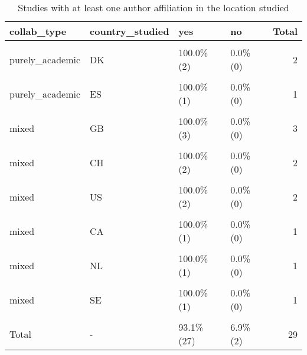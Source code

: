 \documentclass[
]{article}
\begin{document}
\begin{table}[H]

\caption{\label{tab:unnamed-chunk-46}Studies with at least one author affiliation in the location studied}
\centering
\begin{tabular}[t]{llllr}
\toprule
collab\_type & country\_studied & yes & no & Total\\
\midrule
\cellcolor{gray!6}{purely\_academic} & \cellcolor{gray!6}{NL} & \cellcolor{gray!6}{100.0\%  (4)} & \cellcolor{gray!6}{0.0\% (0)} & \cellcolor{gray!6}{4}\\
purely\_academic & DK & 100.0\%  (2) & 0.0\% (0) & 2\\
\cellcolor{gray!6}{purely\_academic} & \cellcolor{gray!6}{GB} & \cellcolor{gray!6}{66.7\%  (2)} & \cellcolor{gray!6}{33.3\% (1)} & \cellcolor{gray!6}{3}\\
purely\_academic & ES & 100.0\%  (1) & 0.0\% (0) & 1\\
\cellcolor{gray!6}{purely\_academic} & \cellcolor{gray!6}{US} & \cellcolor{gray!6}{100.0\%  (1)} & \cellcolor{gray!6}{0.0\% (0)} & \cellcolor{gray!6}{1}\\
\addlinespace
mixed & GB & 100.0\%  (3) & 0.0\% (0) & 3\\
\cellcolor{gray!6}{mixed} & \cellcolor{gray!6}{AU} & \cellcolor{gray!6}{100.0\%  (2)} & \cellcolor{gray!6}{0.0\% (0)} & \cellcolor{gray!6}{2}\\
mixed & CH & 100.0\%  (2) & 0.0\% (0) & 2\\
\cellcolor{gray!6}{mixed} & \cellcolor{gray!6}{FR} & \cellcolor{gray!6}{100.0\%  (2)} & \cellcolor{gray!6}{0.0\% (0)} & \cellcolor{gray!6}{2}\\
mixed & US & 100.0\%  (2) & 0.0\% (0) & 2\\
\addlinespace
\cellcolor{gray!6}{mixed} & \cellcolor{gray!6}{AT} & \cellcolor{gray!6}{100.0\%  (1)} & \cellcolor{gray!6}{0.0\% (0)} & \cellcolor{gray!6}{1}\\
mixed & CA & 100.0\%  (1) & 0.0\% (0) & 1\\
\cellcolor{gray!6}{mixed} & \cellcolor{gray!6}{JP} & \cellcolor{gray!6}{100.0\%  (1)} & \cellcolor{gray!6}{0.0\% (0)} & \cellcolor{gray!6}{1}\\
mixed & NL & 100.0\%  (1) & 0.0\% (0) & 1\\
\cellcolor{gray!6}{mixed} & \cellcolor{gray!6}{NZ} & \cellcolor{gray!6}{100.0\%  (1)} & \cellcolor{gray!6}{0.0\% (0)} & \cellcolor{gray!6}{1}\\
\addlinespace
mixed & SE & 100.0\%  (1) & 0.0\% (0) & 1\\
\cellcolor{gray!6}{mixed} & \cellcolor{gray!6}{UY} & \cellcolor{gray!6}{0.0\%  (0)} & \cellcolor{gray!6}{100.0\% (1)} & \cellcolor{gray!6}{1}\\
Total & - & 93.1\% (27) & 6.9\% (2) & 29\\
\bottomrule
\end{tabular}
\end{table}
\end{document}
